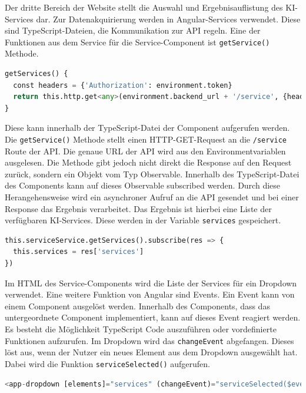 Der dritte Bereich der Website stellt die Auswahl und Ergebnisauflistung des KI-Services dar. Zur Datenakquirierung werden in Angular-Services verwendet. Diese sind TypeScript-Dateien, die Kommunikation zur API regeln. Eine der Funktionen aus dem Service für die Service-Component ist \texttt{getService()} Methode. 

\begin{lstlisting}[language=Python, caption={Abfrage der Services}]
getServices() {
  const headers = {'Authorization': environment.token}
  return this.http.get<any>(environment.backend_url + '/service', {headers})
}
\end{lstlisting}

Diese kann innerhalb der TypeScript-Datei der Component aufgerufen werden. Die \texttt{getService()} Methode stellt einen HTTP-GET-Request an die \texttt{/service} Route der API. Die genaue URL der API wird aus den Environmentvariablen ausgelesen. Die Methode gibt jedoch nicht direkt die Response auf den Request zurück, sondern ein Objekt vom Typ Observable. Innerhalb des TypeScript-Datei des Components kann auf dieses Observable subscribed werden. Durch diese Herangehensweise wird ein asynchroner Aufruf an die API gesendet und bei einer Response das Ergebnis verarbeitet. Das Ergebnis ist hierbei eine Liste der verfügbaren KI-Services. Diese werden in der Variable \texttt{services} gespeichert.

\begin{lstlisting}[language=Python, caption={Subscriben auf einen Observable}]
this.serviceService.getServices().subscribe(res => {
  this.services = res['services']
})
\end{lstlisting}

Im HTML des Service-Components wird die Liste der Services für ein Dropdown verwendet. Eine weitere Funktion von Angular sind Events. Ein Event kann von einem Component ausgelöst werden. Innerhalb des Components, dass das untergeordnete Component implementiert, kann auf dieses Event reagiert werden. Es besteht die Möglichkeit TypeScript Code auszuführen oder vordefinierte Funktionen aufzurufen. Im Dropdown wird das \texttt{changeEvent} abgefangen. Dieses löst aus, wenn der Nutzer ein neues Element aus dem Dropdown ausgewählt hat. Dabei wird die Funktion \texttt{serviceSelected()} aufgerufen.

\begin{lstlisting}[language=Python, caption={Dropdown zur Auswahl der Services}]
<app-dropdown [elements]="services" (changeEvent)="serviceSelected($event)"></app-dropdown>
\end{lstlisting}

